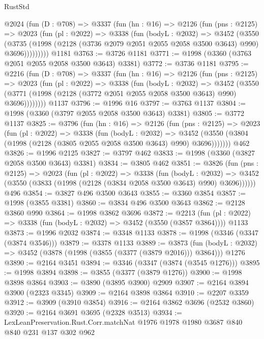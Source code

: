 \begin{lexlean}{RustStd}
\begin{coremodule}
    @2024
      (fun (D : @708) =>
      @3337
        (fun (hn : @16) =>
        @2126
          (fun (pns : @2125) =>
          @2023
            (fun (pl : @2022) =>
            @3338
              (fun (bodyL : @2032) =>
              @3452
                (@3550
                  (@3735
                    (@1998 (@2128 (@3736 @2079 @2051 @2055 @2058 @3500 @3643) @990) @3696)))))))))
    @1181
@3763 := @3726 @1181
@3771 := @1998 (@3360 (@3763 @2051 @2055 @2058 @3500 @3643) @3381)
@3772 := @3736 @1181
@3795 := @2216
    (fun (D : @708) =>
    @3337
      (fun (hn : @16) =>
      @2126
        (fun (pns : @2125) =>
        @2023
          (fun (pl : @2022) =>
          @3338
            (fun (bodyL : @2032) =>
            @3452
              (@3550 (@3771 (@1998 (@2128 (@3772 @2051 @2055 @2058 @3500 @3643) @990) @3696))))))))
    @1137
@3796 := @1996 @16
@3797 := @3763 @1137
@3804 := @1998 (@3360 (@3797 @2055 @2058 @3500 @3643) @3381)
@3805 := @3772 @1137
@3825 := @3796
    (fun (hn : @16) =>
    @2126
      (fun (pns : @2125) =>
      @2023
        (fun (pl : @2022) =>
        @3338
          (fun (bodyL : @2032) =>
          @3452 (@3550 (@3804 (@1998 (@2128 (@3805 @2055 @2058 @3500 @3643) @990) @3696)))))))
    @462
@3826 := @1996 @2125
@3827 := @3797 @462
@3833 := @1998 (@3360 (@3827 @2058 @3500 @3643) @3381)
@3834 := @3805 @462
@3851 := @3826
    (fun (pns : @2125) =>
    @2023
      (fun (pl : @2022) =>
      @3338
        (fun (bodyL : @2032) =>
        @3452 (@3550 (@3833 (@1998 (@2128 (@3834 @2058 @3500 @3643) @990) @3696))))))
    @496
@3854 := @3827 @496 @3500 @3643
@3855 := @3360 @3854
@3857 := @1998 (@3855 @3381)
@3860 := @3834 @496 @3500 @3643
@3862 := @2128 @3860 @990
@3864 := @1998 @3862 @3696
@3872 := @2213
    (fun (pl : @2022) => @3338 (fun (bodyL : @2032) => @3452 (@3550 (@3857 @3864))))
    @1133
@3873 := @1996 @2032
@3874 := @3348 @1133
@3878 := @1998 (@3346 (@3347 (@3874 @3546)))
@3879 := @3378 @1133
@3889 := @3873
    (fun (bodyL : @2032) => @3452 (@3878 (@1998 (@3855 (@3377 (@3879 @2016))) @3864)))
    @1276
@3890 := @2164 @3451
@3894 := @3346 (@3347 (@3874 (@3545 @1276)))
@3895 := @1998 @3894
@3898 := @3855 (@3377 (@3879 @1276))
@3900 := @1998 @3898 @3864
@3903 := @3890 (@3895 @3900) @2909
@3907 := @2164 @3894 @3900 (@2323 @3345)
@3909 := @2164 @3898 @3864
@3910 := @2207 @3359
@3912 := @3909 (@3910 @3854)
@3916 := @2164 @3862 @3696 (@2532 @3860)
@3920 := @2164 @3691 @3695 (@2328 @3513)
@3934 := LexLeanPreservation.Rust.Corr.matchNat
    @1976
    @1978
    @1980
    @3687
    @840
    @840
    @231
    @137
    @302
    @962

\end{coremodule}
\end{lexlean}
